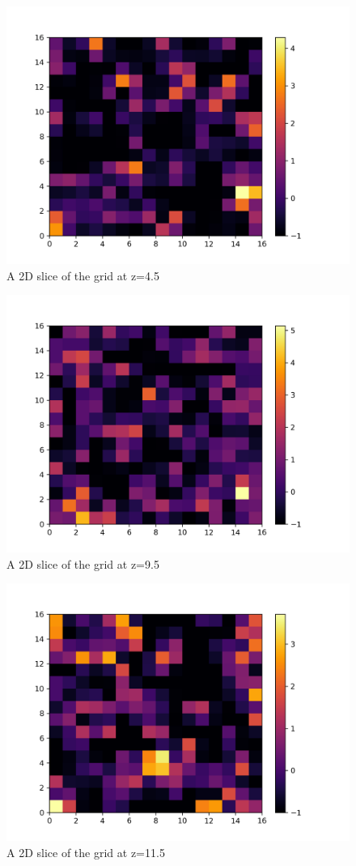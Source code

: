 \documentclass[a4paper,10pt]{article}
\begin{document}
\begin{figure}[H]
  \centering
  \includegraphics[width=.8\linewidth]{./plots/2d_slice_4.5.png}
  \caption{A 2D slice of the grid at z=4.5}
  \label{fig:2d_4}
\end{figure}

\begin{figure}[H]
  \centering
  \includegraphics[width=.8\linewidth]{./plots/2d_slice_9.5.png}
  \caption{A 2D slice of the grid at z=9.5}
  \label{fig:2d_9}
\end{figure}

\begin{figure}[H]
  \centering
  \includegraphics[width=.8\linewidth]{./plots/2d_slice_11.5.png}
  \caption{A 2D slice of the grid at z=11.5}
  \label{fig:2d_11}
\end{figure}
\end{document}
